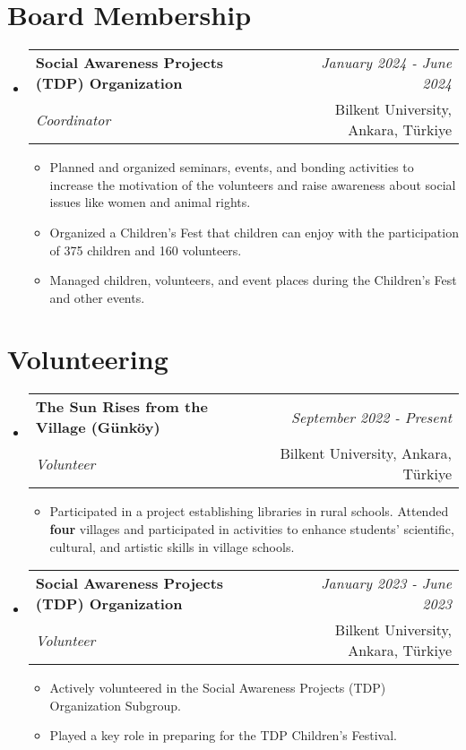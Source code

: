\documentclass[a4paper,11pt]{article}
\makeatletter
\newcommand{\resumeSubheading}[4]{
\vspace{0.5mm}\item
    \begin{tabular*}{0.98\textwidth}[t]{l@{\extracolsep{\fill}}r}
    \textbf{#1} & \textit{\footnotesize{#4}} \\
    \textit{\footnotesize{#3}} &  \footnotesize{#2} \\
    \end{tabular*}\vspace{-2.4mm}
}
\newcommand{\resumeSubHeadingListStart}{\begin{itemize}[leftmargin=*,labelsep=0mm]}
\newcommand{\resumeItemListStart}{\begin{justify}\begin{itemize}[leftmargin=3ex, rightmargin=2ex, noitemsep,labelsep=1.2mm,itemsep=0mm]\small}
\newcommand{\resumeSubHeadingListEnd}{\end{itemize}\vspace{2mm}}
\newcommand{\resumeItemListEnd}{\end{itemize}\end{justify}\vspace{-2mm}}
\makeatother
\begin{document}

\section{\textbf{Board Membership}}
    \resumeSubHeadingListStart
        \resumeSubheading
            {Social Awareness Projects (TDP) Organization}{Bilkent University, Ankara, Türkiye}
            {Coordinator}{January 2024 - June 2024}
                \resumeItemListStart
                    \item Planned and organized seminars, events, and bonding activities to increase the motivation of the volunteers and raise awareness about social issues like women and animal rights.
                    \item Organized a Children’s Fest that children can enjoy with the participation of 375 children and 160 volunteers.
                    \item Managed children, volunteers, and event places during the Children’s Fest and other events.
                \resumeItemListEnd
    \resumeSubHeadingListEnd
\vspace{-6.5mm}


\section{\textbf{Volunteering}}
    \resumeSubHeadingListStart
        \resumeSubheading
            {The Sun Rises from the Village (Günköy)}{Bilkent University, Ankara, Türkiye}
            {Volunteer}{September 2022 - Present}
                \resumeItemListStart
                    \item Participated in a project establishing libraries in rural schools. Attended {\textbf{four}} villages and participated in activities to enhance students' scientific, cultural, and artistic skills in village schools.
                \resumeItemListEnd
        \resumeSubheading
            {Social Awareness Projects (TDP) Organization}{Bilkent University, Ankara, Türkiye}
            {Volunteer}{January 2023 - June 2023}
                \resumeItemListStart
                    \item Actively volunteered in the Social Awareness Projects (TDP) Organization Subgroup.
                    \item Played a key role in preparing for the TDP Children’s Festival.
                \resumeItemListEnd
    \resumeSubHeadingListEnd
\vspace{-6.5mm}
\end{document}
